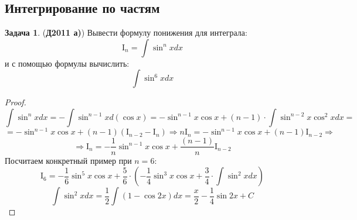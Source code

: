 \documentclass[12pt]{article}
\newcommand{\MI}{\mathrm{I}}
\theoremstyle{definition}
\newtheorem{problem}{Задача}
\DeclareMathOperator{\dint}{\displaystyle\int}
\begin{document}
\subsection*{Интегрирование по частям}
\begin{problem}(\textbf{Д2011 а)})
	Вывести формулу понижения для интеграла:
	$$
		\MI_n = \dint \sin^n{x}dx
	$$
	и с помощью формулы вычислить:
	$$
		\dint \sin^6{x}dx
	$$
\end{problem}
\begin{proof}
	$$
		\dint \sin^n{x}dx =  - \dint \sin^{n-1}{x}d(\cos{x}) = -\sin^{n-1}{x}\cos{x} + (n-1){\cdot}\dint \sin^{n-2}{x}\cos^2{x}dx =
	$$
	$$
		=-\sin^{n-1}{x}\cos{x} + (n-1)(\MI_{n-2} - \MI_{n}) \Rightarrow n\MI_n = -\sin^{n-1}{x}\cos{x} + (n-1)\MI_{n-2}  \Rightarrow
	$$
	$$
		\Rightarrow \MI_n = -\dfrac{1}{n}\sin^{n-1}{x}\cos{x} + \dfrac{(n-1)}{n}\MI_{n-2}
	$$
	Посчитаем конкретный пример при $n = 6$:
	$$
		\MI_6 = -\dfrac{1}{6}\sin^{5}{x}\cos{x} + \dfrac{5}{6}{\cdot}\left(-\dfrac{1}{4}\sin^{3}{x}\cos{x} + \dfrac{3}{4}{\cdot}\dint\sin^2{x}dx\right)
	$$
	$$
		\dint \sin^2{x}dx = \dfrac{1}{2}\dint (1 - \cos{2x})dx = \dfrac{x}{2} - \dfrac{1}{4}\sin{2x} + C
	$$
\end{proof}
\end{document}
